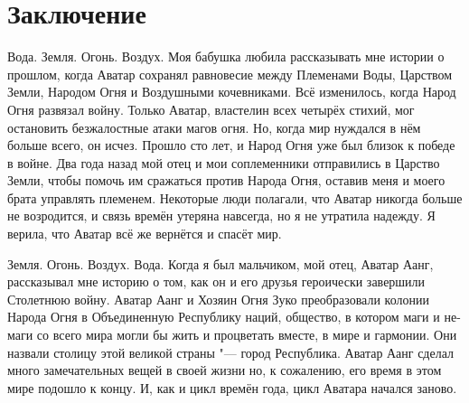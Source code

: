 \chapter*{Заключение} \label{ch-conclusion}

Вода. Земля. Огонь. Воздух. Моя бабушка любила рассказывать мне истории о прошлом, когда Аватар сохранял равновесие между Племенами Воды, Царством Земли, Народом Огня и Воздушными кочевниками. Всё изменилось, когда Народ Огня развязал войну. Только Аватар, властелин всех четырёх стихий, мог остановить безжалостные атаки магов огня. Но, когда мир нуждался в нём больше всего, он исчез. Прошло сто лет, и Народ Огня уже был близок к победе в войне. Два года назад мой отец и мои соплеменники отправились в Царство Земли, чтобы помочь им сражаться против Народа Огня, оставив меня и моего брата управлять племенем. Некоторые люди полагали, что Аватар никогда больше не возродится, и связь времён утеряна навсегда, но я не утратила надежду. Я верила, что Аватар всё же вернётся и спасёт мир.

Земля. Огонь. Воздух. Вода. Когда я был мальчиком, мой отец, Аватар Аанг, рассказывал мне историю о том, как он и его друзья героически завершили Столетнюю войну. Аватар Аанг и Хозяин Огня Зуко преобразовали колонии Народа Огня в Объединенную Республику наций, общество, в котором маги и не-маги со всего мира могли бы жить и процветать вместе, в мире и гармонии. Они назвали столицу этой великой страны "--- город Республика. Аватар Аанг сделал много замечательных вещей в своей жизни но, к сожалению, его время в этом мире подошло к концу. И, как и цикл времён года, цикл Аватара начался заново.

